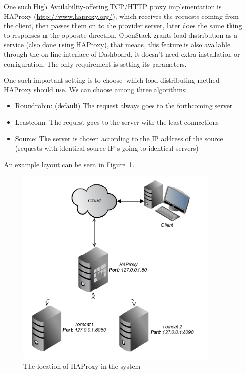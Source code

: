 \documentclass[a4paper]{article}
\begin{document}
One such High Availability-offering TCP/HTTP proxy implementation is HAProxy (\url{http://www.haproxy.org/}), which
receives the requests coming from the client, then passes them on to the provider server, later does the same thing to
responses in the opposite direction. OpenStack grants load-distribution as a service (also done using HAProxy), that
means, this feature is also available through the on-line interface of Dashboard, it doesn't need extra installation or
configuration. The only requirement is setting its parameters.

One such important setting is to choose, which load-distributing method HAProxy should use. We can choose among three
algorithms:
\begin{itemize}
    \item Roundrobin: (default) The request always goes to the forthcoming server
    \item Leastconn: The request goes to the server with the least connections
    \item Source: The server is chosen according to the IP address of the source (requests with identical source IP-s
          going
          to identical servers)
\end{itemize}
An example layout can be seen in Figure~\ref{fig:haproxy}.

\begin{figure}[H]
    \centering
    \includegraphics[width=0.9\textwidth]{figures/haproxy.png}
    \caption{The location of HAProxy in the system}
    \label{fig:haproxy}
\end{figure}
\end{document}
